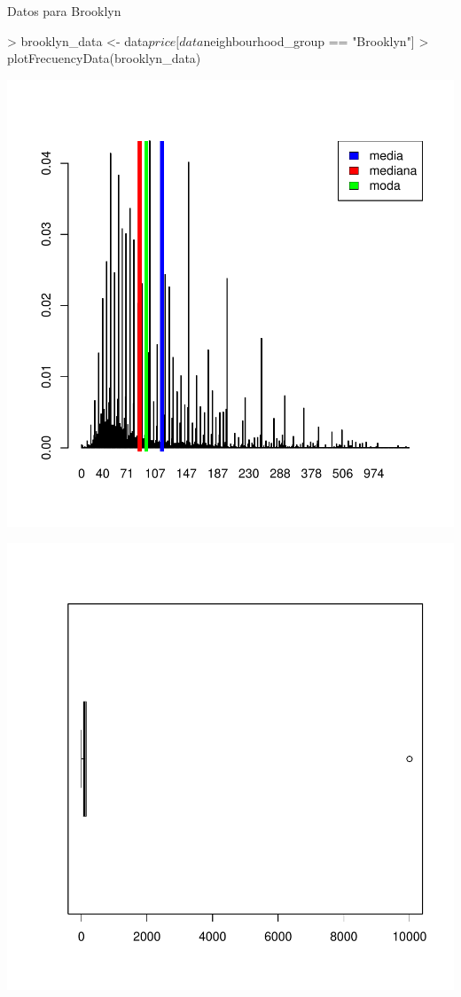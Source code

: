 \documentclass [a4paper] {article}
\begin{document}
Datos para Brooklyn
\begin{center}
\begin{Schunk}
\begin{Sinput}
> brooklyn_data <- data$price[data$neighbourhood_group == "Brooklyn"]
> plotFrecuencyData(brooklyn_data)
\end{Sinput}
\end{Schunk}
\includegraphics{entrega-028}
\end{center}
\begin{center}
\includegraphics{entrega-029}
\end{center}
\end{document}
